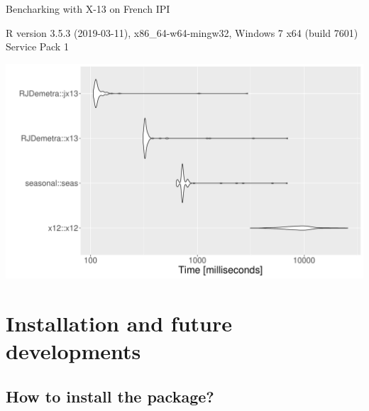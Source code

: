 \documentclass[10pt,xcolor=table,color={dvipsnames,usenames},ignorenonframetext,usepdftitle=false,french]{beamer}
\begin{document}
\begin{frame}{Bencharking with X-13 on French IPI}
\protect\hypertarget{bencharking-with-x-13-on-french-ipi}{}

\footnotesize

R version 3.5.3 (2019-03-11), x86\_64-w64-mingw32, Windows 7 x64 (build
7601) Service Pack 1

\includegraphics{img/markdown-unnamed-chunk-19-1.pdf}

\end{frame}

\hypertarget{installation-and-future-developments}{%
\section{Installation and future
developments}\label{installation-and-future-developments}}

\hypertarget{how-to-install-the-package}{%
\subsection{How to install the
package?}\label{how-to-install-the-package}}
\end{document}
